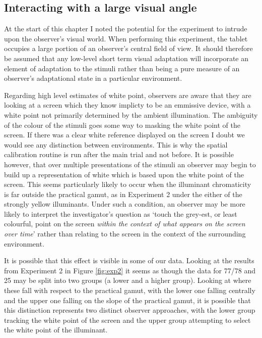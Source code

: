 \subsection{Interacting with a large visual angle}

At the start of this chapter I noted the potential for the experiment to intrude upon the observer's visual world. When performing this experiment, the tablet occupies a large portion of an observer's central field of view. It should therefore be assumed that any low-level short term visual adaptation will incorporate an element of adaptation to the stimuli rather than being a pure measure of an observer's adaptational state in a particular environment. 

Regarding high level estimates of white point, observers are aware that they are looking at a screen which they know implicty to be an emmissive device, with a white point not primarily determined by the ambient illumination. The ambiguity of the colour of the stimuli goes some way to masking the white point of the screen. If there was a clear white reference displayed on the screen I doubt we would see any distinction between environments. This is why the spatial calibration routine is run after the main trial and not before. It is possible however, that over multiple presentations of the stimuli an observer may begin to build up a representation of white which is based upon the white point of the screen. This seems particularly likely to occur when the illuminant chromaticity is far outside the practical gamut, as in Experiment 2 under the either of the strongly yellow illuminants. Under such a condition, an observer may be more likely to interpret the investigator's question as `touch the grey-est, or least colourful, point on the screen \emph{within the context of what appears on the screen over time}' rather than relating to the screen in the context of the surrounding environment.

It is possible that this effect is visible in some of our data. Looking at the results from Experiment 2 in Figure \ref{fig:exp2} it seems as though the data for 77/78 and 25 may be split into two groups (a lower and a higher group). Looking at where these fall with respect to the practical gamut, with the lower one falling centrally and the upper one falling on the slope of the practical gamut, it is possible that this distinction represents two distinct observer approaches, with the lower group tracking the white point of the screen and the upper group attempting to select the white point of the illuminant.

